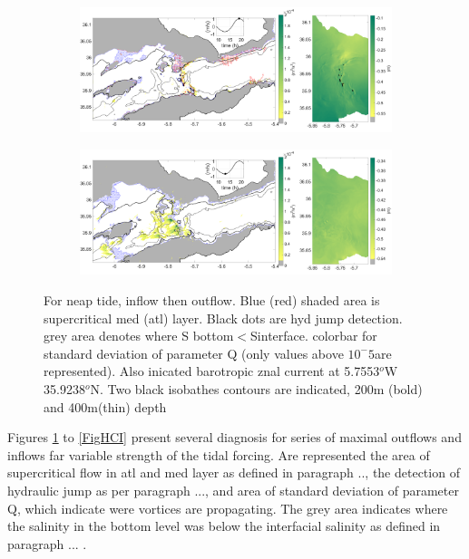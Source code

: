 \begin{figure}[!h]
 \centering
 
 \begin{subfigure}{\linewidth}
\centering
\includegraphics[width=1\linewidth]{./GBR3D/ME2_19h_p.png}
\end{subfigure}
 
 \begin{subfigure}{\linewidth}
\centering
\includegraphics[width=\linewidth]{./GBR3D/ME2_13h_p.png}
\end{subfigure}
\caption {For neap tide, inflow then outflow. Blue (red) shaded area is supercritical med (atl) layer. Black dots are hyd jump detection. grey area denotes where S bottom$<$Sinterface. colorbar for standard deviation of parameter Q (only values above $10^-5$are represented). Also inicated barotropic znal current at 5.7553$^o$W  35.9238$^o$N. Two black isobathes contours are indicated, 200m (bold) and 400m(thin) depth  }
\label{FigHCN}
\end{figure}

Figures \ref{FigHCN} to \ref{FigHCI} present several diagnosis for series of maximal outflows and inflows far variable strength of the tidal forcing. Are represented the area of supercritical flow in atl and med layer as defined in paragraph .., the detection of hydraulic jump as per paragraph ..., and area of standard deviation of parameter Q, which indicate were vortices are propagating. The grey area indicates where the salinity in the bottom level was below the interfacial salinity as defined in paragraph ... .

